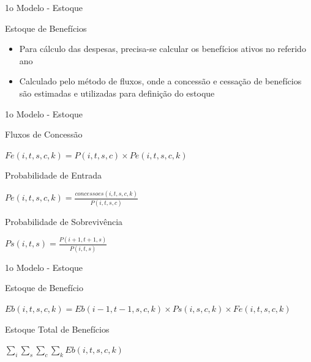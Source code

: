\begin{frame}{1o Modelo - Estoque}
  \begin{block}{Estoque de Benefícios}
    \begin{itemize}
      \item Para cálculo das despesas, precisa-se calcular os \alert{benefícios
      ativos} no referido ano
      \item Calculado pelo método de fluxos, onde a concessão e cessação de
      benefícios são estimadas e utilizadas para definição do estoque
    \end{itemize}
  \end{block}
\end{frame}

\begin{frame}{1o Modelo - Estoque}
  \begin{block}{Fluxos de Concessão}
    \begin{center}
      $Fe(i,t,s,c,k) = P(i,t,s,c) \times Pe(i,t,s,c,k)$
    \end{center}
  \end{block}
  \begin{block}{Probabilidade de Entrada}
    \begin{center}
      $Pe(i,t,s,c,k) = \frac{concessoes(i,t,s,c,k)}{P(i,t,s,c)}$
    \end{center}
  \end{block}
  \begin{block}{Probabilidade de Sobrevivência}
    \begin{center}
      $Ps (i, t, s) = \frac{P(i+1, t+1, s)}{P(i,t,s)}$
    \end{center}
  \end{block}
\end{frame}

\begin{frame}{1o Modelo - Estoque}
  \begin{block}{Estoque de Benefício}
    \begin{center}
      $Eb(i, t, s, c, k) = Eb(i-1, t-1, s, c, k) \times Ps(i,s,c,k) \times
      Fe(i, t ,s, c, k)$
    \end{center}
  \end{block}
  \begin{block}{Estoque Total de Benefícios}
    \begin{center}
      $\sum_i \sum_s \sum_c \sum_k Eb(i,t,s,c,k)$
    \end{center}
  \end{block}
\end{frame}

